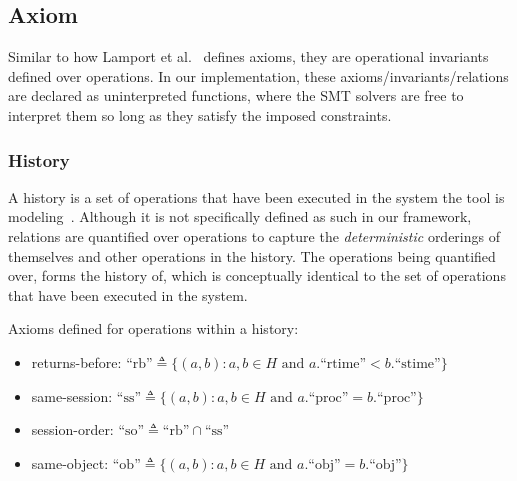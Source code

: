 \subsection{Axiom}

%
%
Similar to how Lamport et al.~\cite{lamport1977proving} defines axioms, they are
operational invariants defined over operations. In our implementation, these
axioms/invariants/relations are declared as uninterpreted functions, where the
SMT solvers are free to interpret them so long as they satisfy the imposed
constraints.

\subsubsection{History}

%
%

A history is a set of operations that have been executed in the system the tool
is modeling~\cite{viotti2016consistency}. Although it is not specifically defined as
such in our framework, relations are quantified over operations to capture the
\textit{deterministic} orderings of themselves and other operations in the history. The
operations being quantified over, forms the history of, which is conceptually
identical to the set of operations that have been executed in the system.

Axioms defined for operations within a history:

\begin{itemize}
\item returns-before: $\text{``rb''} \triangleq \{(a, b) : a, b \in H \text{ and } a.\text{``rtime''} < b.\text{``stime''}\}$

\item same-session: $\text{``ss''} \triangleq \{(a, b) : a, b \in H \text{ and } a.\text{``proc''} = b.\text{``proc''}\}$

\item session-order: $\text{``so''} \triangleq \text{``rb''} \cap \text{``ss''}$

\item same-object: $\text{``ob''} \triangleq \{(a, b) : a, b \in H \text{ and } a.\text{``obj''} = b.\text{``obj''}\}$
\end{itemize}

